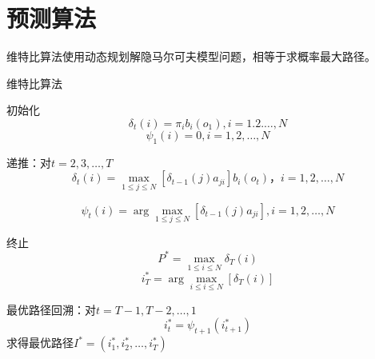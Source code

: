 \documentclass{article}
\begin{document}
		\section{预测算法}
		维特比算法使用动态规划解隐马尔可夫模型问题，相等于求概率最大路径。
		\begin{algorithm}[h]
			\caption{维特比算法}
			\LinesNumbered
			初始化$$\delta _{t}\left ( i \right )=\pi_{i}b_{i}\left ( o_{1} \right ),i=1.2.\ldots,N$$
			$$\psi _{1}\left ( i \right )=0,i=1,2,\ldots,N$$
			
			递推：对$t=2,3,\ldots,T$
			$$\delta _{t}\left ( i \right )=\mathop{max}_{1\leq j\leq N}\left [ \delta _{t-1}\left ( j \right ) a_{ji}\right ]b_{i}\left ( o_{t} \right )，i=1,2,\ldots,N$$
			
			$$\psi _{t}\left ( i \right )=\arg \mathop{max}_{1\leq j\leq N}\left [ \delta _{t-1}\left ( j \right ) a_{ji}\right ],i=1,2,\ldots,N$$
			
			终止$$P^{*}=\mathop{max}_{1\leq i\leq N}\delta _{T}\left ( i \right )$$  $$i_{T}^{*}=\arg \mathop{max}_{i\leq i\leq N}\left [ \delta _{T}\left ( i \right ) \right ]$$
			
			最优路径回溯：对$t=T-1,T-2,\ldots,1$
			$$i_{t}^{*}=\psi _{t+1}\left ( i_{t+1}^{*} \right )$$求得最优路径$I^{*}=\left ( i^{*}_{1},i^{*}_{2},\ldots,i_{T}^{*} \right )$
			
		\end{algorithm}
\end{document}
